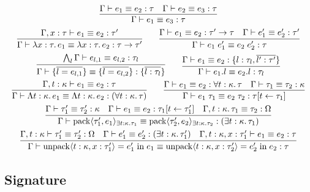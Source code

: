\begin{gather*}
  \infer{\Gamma \vdash e_1 \equiv e_3: \tau}{
    \Gamma \vdash e_1 \equiv e_2: \tau
    &
    \Gamma \vdash e_2 \equiv e_3: \tau
  }
  \\
  \infer{\Gamma \vdash \lambda x: \tau\ldotp e_1 \equiv \lambda x: \tau\ldotp e_2: \tau \to \tau'}{
    \Gamma, x: \tau \vdash e_1 \equiv e_2: \tau'
  }
  \hspace{2em}
  \infer{\Gamma \vdash e_1\; e'_1 \equiv e_2\; e'_2: \tau}{
    \Gamma \vdash e_1 \equiv e_2: \tau' \to \tau
    &
    \Gamma \vdash e'_1 \equiv e'_2: \tau'
  }
  \\
  \infer{\Gamma \vdash \{\overline{l = e_{l,1}}\} \equiv \{\overline{l = e_{l,2}}\}: \{\overline{l: \tau_l}\}}{
    \bigwedge_l \Gamma \vdash e_{l,1} \equiv e_{l,2}: \tau_l
  }
  \hspace{2em}
  \infer{\Gamma \vdash e_1.l \equiv e_2.l: \tau_l}{
    \Gamma \vdash e_1 \equiv e_2: \{l: \tau_l, \overline{l': \tau'}\}
  }
  \\
  \infer{\Gamma \vdash \Lambda t: \kappa\ldotp e_1 \equiv \Lambda t: \kappa\ldotp e_2: (\forall t: \kappa\ldotp \tau)}{
    \Gamma, t: \kappa \vdash e_1 \equiv e_2: \tau
  }
  \hspace{2em}
  \infer{\Gamma \vdash e_1\; \tau_1 \equiv e_2\; \tau_2: \tau[t \assign \tau_1]}{
    \Gamma \vdash e_1 \equiv e_2: \forall t: \kappa\ldotp \tau
    &
    \Gamma \vdash \tau_1 \equiv \tau_2: \kappa
  }
  \\
  \infer{\Gamma \vdash \sympack\langle \tau'_1, e_1\rangle_{\exists t: \kappa\ldotp \tau_1} \equiv \sympack\langle \tau'_2, e_2\rangle_{\exists t: \kappa\ldotp \tau_2}: (\exists t: \kappa\ldotp \tau_1)}{
    \Gamma \vdash \tau'_1 \equiv \tau'_2: \kappa
    &
    \Gamma \vdash e_1 \equiv e_2: \tau_1[t \assign \tau'_1]
    &
    \Gamma, t: \kappa\ldotp \tau_1 \equiv \tau_2: \Omega
  }
  \\
  \infer{\Gamma \vdash \symunpack\langle t: \kappa, x: \tau'_1\rangle = e'_1 \symin e_1 \equiv \symunpack\langle t: \kappa, x: \tau'_2\rangle = e'_2 \symin e_2: \tau}{
    \Gamma, t: \kappa \vdash \tau'_1 \equiv \tau'_2: \Omega
    &
    \Gamma \vdash e'_1 \equiv e'_2: (\exists t: \kappa\ldotp \tau'_1)
    &
    \Gamma, t: \kappa, x: \tau'_1 \vdash e_1 \equiv e_2: \tau
  }
\end{gather*}

\subsection{Signature}

